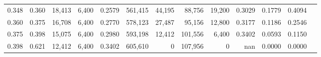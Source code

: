 \begin{tabular}{rrrrrrrrrrrrr}
0.348 & 0.360 & 18,413 & 6,400 &                                     0.2579 & 561,415 &  44,195 &  88,756 &  19,200 & 0.3029 & 0.1779 & 0.4094 \\
0.360 & 0.375 & 16,708 & 6,400 &                                     0.2770 & 578,123 &  27,487 &  95,156 &  12,800 & 0.3177 & 0.1186 & 0.2546 \\
0.375 & 0.398 & 15,075 & 6,400 &                                     0.2980 & 593,198 &  12,412 & 101,556 &   6,400 & 0.3402 & 0.0593 & 0.1150 \\
0.398 & 0.621 & 12,412 & 6,400 &                                     0.3402 & 605,610 &       0 & 107,956 &       0 &    nan & 0.0000 & 0.0000 \\
\bottomrule
\end{tabular}
